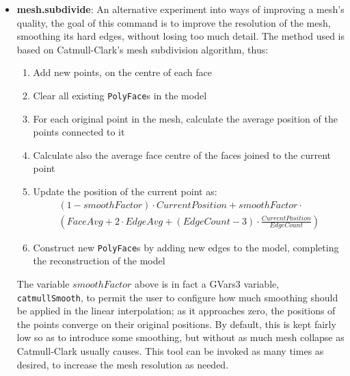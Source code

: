 \documentclass[a4paper,10pt]{article}
\begin{document}
\begin{itemize}
\item{\textbf{mesh.subdivide}: An alternative experiment into ways of improving a mesh's quality, the goal of this command is to improve the resolution of the mesh, smoothing its hard edges, without losing too much detail. The method used is based on Catmull-Clark's mesh subdivision algorithm\cite{catmull}, thus:
\begin{enumerate}
\item{Add new points, on the centre of each face}
\item{Clear all existing \texttt{PolyFace}s in the model}
\item{For each original point in the mesh, calculate the average position of the points connected to it}
\item{Calculate also the average face centre of the faces joined to the current point}
\item{Update the position of the current point as:
\begin{eqnarray*}
 (1 - smoothFactor) \cdot CurrentPosition + smoothFactor \cdot \\ (FaceAvg + 2 \cdot EdgeAvg + (EdgeCount-3) \cdot \frac{CurrentPosition}{EdgeCount})
\end{eqnarray*}
}
\item{Construct new \texttt{PolyFace}s by adding new edges to the model, completing the reconstruction of the model}
\end{enumerate}

The variable $smoothFactor$ above is in fact a GVars3 variable, \texttt{catmullSmooth}, to permit the user to configure how much smoothing should be applied in the linear interpolation; as it approaches zero, the positions of the points converge on their original positions. By default, this is kept fairly low so as to introduce some smoothing, but without as much mesh collapse as Catmull-Clark usually causes. This tool can be invoked as many times as desired, to increase the mesh resolution as needed.
}


\end{itemize}
\end{document}
